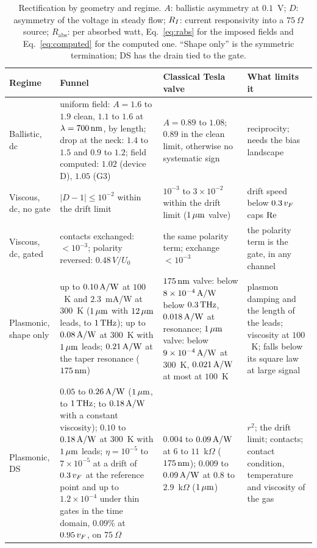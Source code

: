 \begin{table}
\caption{Rectification by geometry and regime. $A$: ballistic asymmetry at
$0.1$~V; $D$: asymmetry of the voltage in steady flow; $\RI$: current
responsivity into a $75\ \Omega$ source; $R_{\mathrm{abs}}$: per absorbed
watt, Eq.~\eqref{eq:rabs} for the imposed fields and
Eq.~\eqref{eq:computed} for the computed one. ``Shape only'' is the symmetric termination; DS
has the drain tied to the gate.}
\label{tab:verdict}
\begin{ruledtabular}
\begin{tabular}{L{0.15\textwidth}L{0.31\textwidth}L{0.24\textwidth}L{0.23\textwidth}}
Regime & Funnel & Classical Tesla valve & What limits it \\
\hline
Ballistic, dc & uniform field: $A=1.6$ to $1.9$ clean, $1.1$ to $1.6$ at $\lambda=700\,\mathrm{nm}$, by length; drop at the neck: $1.4$ to $1.5$ and $0.9$ to $1.2$; field computed: $1.02$ (device D), $1.05$ (G3) & $A=0.89$ to $1.08$; $0.89$ in the clean limit, otherwise no systematic sign & reciprocity; needs the bias landscape \\
Viscous, dc, no gate & $|D-1|\leq10^{-2}$ within the drift limit & $10^{-3}$ to $3\times10^{-2}$ within the drift limit ($1\,\mu\mathrm{m}$ valve) & drift speed below $0.3\,v_{F}$ caps $\mathrm{Re}$ \\
Viscous, dc, gated & contacts exchanged: $<10^{-3}$; polarity reversed: $0.48\,V/U_{0}$ & the same polarity term; exchange $<10^{-3}$ & the polarity term is the gate, in any channel \\
Plasmonic, shape only & up to $0.10\,\mathrm{A/W}$ at $100$~K and $2.3$~mA/W at $300$~K ($1\,\mu\mathrm{m}$ with $12\,\mu\mathrm{m}$ leads, to $1\,\mathrm{THz}$); up to $0.08\,\mathrm{A/W}$ at $300$~K with $1\,\mu\mathrm{m}$ leads; $0.21\,\mathrm{A/W}$ at the taper resonance ($175\,\mathrm{nm}$) & $175\,\mathrm{nm}$ valve: below $8\times10^{-4}\,\mathrm{A/W}$ below $0.3\,\mathrm{THz}$, $0.018\,\mathrm{A/W}$ at resonance; $1\,\mu\mathrm{m}$ valve: below $9\times10^{-4}\,\mathrm{A/W}$ at $300$~K, $0.021\,\mathrm{A/W}$ at most at $100$~K & plasmon damping and the length of the leads; viscosity at $100$~K; falls below its square law at large signal \\
Plasmonic, DS & $0.05$ to $0.26\,\mathrm{A/W}$ ($1\,\mu\mathrm{m}$, to $1\,\mathrm{THz}$; to $0.18\,\mathrm{A/W}$ with a constant viscosity); $0.10$ to $0.18\,\mathrm{A/W}$ at $300$~K with $1\,\mu\mathrm{m}$ leads; $\eta=10^{-5}$ to $7\times10^{-5}$ at a drift of $0.3\,v_{F}$ at the reference point and up to $1.2\times10^{-4}$ under thin gates in the time domain, $0.09\%$ at $0.95\,v_{F}$, on $75\ \Omega$ & $0.004$ to $0.09\,\mathrm{A/W}$ at $6$ to $11$~k$\Omega$ ($175\,\mathrm{nm}$); $0.009$ to $0.09\,\mathrm{A/W}$ at $0.8$ to $2.9$~k$\Omega$ ($1\,\mu\mathrm{m}$) & $r^{2}$; the drift limit; contacts; contact condition, temperature and viscosity of the gas \\

\end{tabular}
\end{ruledtabular}
\end{table}
